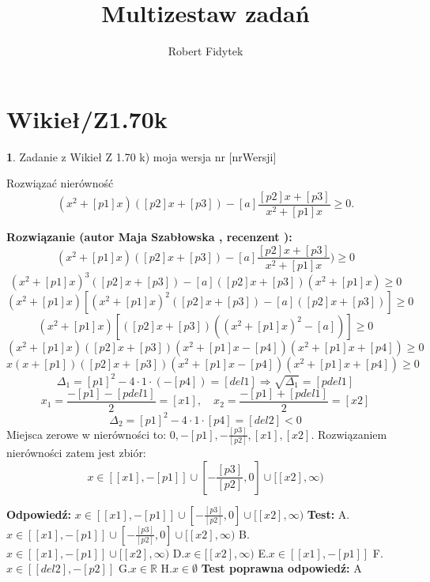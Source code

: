 \documentclass[12pt, a4paper]{article}
\title{Multizestaw zadań}
\author{Robert Fidytek}
\date{}
\theoremstyle{definition} %
\newtheorem{zad}{}
\newcommand{\kategoria}[1]{\section{#1}} %
\newcommand{\zadStart}[1]{\begin{zad}#1\newline} %
\newcommand{\zadStop}{\end{zad}}   %
\newcommand{\rozwStart}[2]{\noindent \textbf{Rozwiązanie (autor #1 , recenzent #2): }\newline} %
\newcommand{\rozwStop}{\newline}                                            %
\newcommand{\odpStart}{\noindent \textbf{Odpowiedź:}\newline}    %
\newcommand{\odpStop}{\newline}                                             %
\newcommand{\testStart}{\noindent \textbf{Test:}\newline} %
\newcommand{\testStop}{\newline} %
\newcommand{\kluczStart}{\noindent \textbf{Test poprawna odpowiedź:}\newline} %
\newcommand{\kluczStop}{\newline} %
\begin{document}
\maketitle


\kategoria{Wikieł/Z1.70k}
\zadStart{Zadanie z Wikieł Z 1.70 k)  moja wersja nr [nrWersji]}


Rozwiązać nierówność $$(x^{2}+[p1]x)([p2]x+[p3])-[a]\frac{[p2]x+[p3]}{x^{2}+[p1]x}\geq0.$$

\zadStop

\rozwStart{Maja Szabłowska}{}
$$(x^{2}+[p1]x)([p2]x+[p3])-[a]\frac{[p2]x+[p3]}{x^{2}+[p1]x})\geq0$$
$$(x^{2}+[p1]x)^{3}([p2]x+[p3])-[a]([p2]x+[p3])(x^{2}+[p1]x)\geq 0$$
$$(x^{2}+[p1]x)[(x^{2}+[p1]x)^{2}([p2]x+[p3])-[a]([p2]x+[p3])]\geq 0$$
$$(x^{2}+[p1]x)[([p2]x+[p3])((x^{2}+[p1]x)^{2}-[a])]\geq 0$$
$$(x^{2}+[p1]x)([p2]x+[p3])(x^{2}+[p1]x-[p4])(x^{2}+[p1]x+[p4])\geq 0$$
$$x(x+[p1])([p2]x+[p3])(x^{2}+[p1]x-[p4])(x^{2}+[p1]x+[p4])\geq 0$$
$$\Delta_{1}=[p1]^{2}-4\cdot1\cdot(-[p4])=[del1] \Rightarrow \sqrt{\Delta_{1}}=[pdel1]$$
$$x_{1}=\frac{-[p1]-[pdel1]}{2}=[x1], \quad x_{2}=\frac{-[p1]+[pdel1]}{2}=[x2]$$
$$\Delta_{2}=[p1]^{2}-4\cdot 1 \cdot [p4] =[del2]<0$$
Miejsca zerowe w nierówności to: $ 0,-[p1], -\frac{[p3]}{[p2]}, [x1], [x2].$
Rozwiązaniem nierówności zatem jest zbiór:
$$x\in[[x1],-[p1]]\cup\left[-\frac{[p3]}{[p2]},0\right]\cup[[x2],\infty)$$
\rozwStop


\odpStart
$x\in[[x1],-[p1]]\cup\left[-\frac{[p3]}{[p2]},0\right]\cup[[x2],\infty)$
\odpStop
\testStart
A.$x\in[[x1],-[p1]]\cup\left[-\frac{[p3]}{[p2]},0\right]\cup[[x2],\infty)$
B.$x\in[[x1],-[p1]]\cup[[x2],\infty)$
D.$x\in[[x2],\infty)$
E.$x\in[[x1],-[p1]]$
F.$x\in[[del2],-[p2]]$
G.$x\in\mathbb{R}$
H.$x\in\emptyset$
\testStop
\kluczStart
A
\kluczStop
\end{document}
